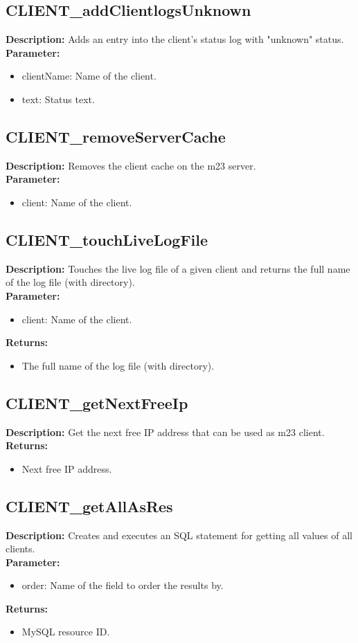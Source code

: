 \subsection{CLIENT\_addClientlogsUnknown}
\textbf{Description:} Adds an entry into the client's status log with "unknown" status.\\
\textbf{Parameter:}
\begin{itemize}
\item clientName: Name of the client.
\item text: Status text.
\end{itemize}

\subsection{CLIENT\_removeServerCache}
\textbf{Description:} Removes the client cache on the m23 server.\\
\textbf{Parameter:}
\begin{itemize}
\item client: Name of the client.
\end{itemize}

\subsection{CLIENT\_touchLiveLogFile}
\textbf{Description:} Touches the live log file of a given client and returns the full name of the log file (with directory).\\
\textbf{Parameter:}
\begin{itemize}
\item client: Name of the client.
\end{itemize}
\textbf{Returns:}
\begin{itemize}
\item The full name of the log file (with directory).
\end{itemize}

\subsection{CLIENT\_getNextFreeIp}
\textbf{Description:} Get the next free IP address that can be used as m23 client.\\
\textbf{Returns:}
\begin{itemize}
\item Next free IP address.
\end{itemize}

\subsection{CLIENT\_getAllAsRes}
\textbf{Description:} Creates and executes an SQL statement for getting all values of all clients.\\
\textbf{Parameter:}
\begin{itemize}
\item order: Name of the field to order the results by.
\end{itemize}
\textbf{Returns:}
\begin{itemize}
\item MySQL resource ID.
\end{itemize}

